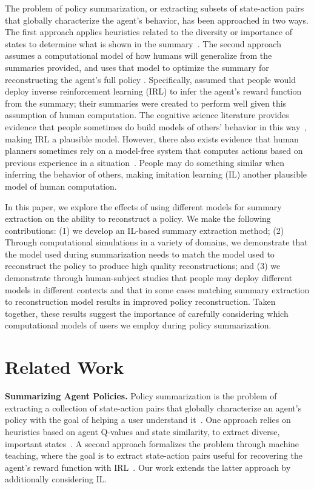 \documentclass{article}
\begin{document}
The problem of policy summarization, or extracting subsets of state-action pairs that globally characterize the agent's behavior, has been approached in two ways. The first approach applies heuristics related to the diversity or importance of states to determine what is shown in the summary~\cite{amir2018highlights,huang2018establishing}. The second approach assumes a computational model of how humans will generalize from the summaries provided, and uses that model to optimize the summary for reconstructing the agent's full policy \cite{huang17communicate}. Specifically, \cite{huang17communicate} assumed that people would deploy inverse reinforcement learning (IRL) to infer the agent's reward function from the summary; their summaries were created to perform well given this assumption of human computation. The cognitive science literature provides evidence that people sometimes do build models of others' behavior in this way~\cite{baker2009action,baker2011bayesian}, making IRL a plausible model. However, there also exists evidence that human planners sometimes rely on a model-free system that computes actions based on previous experience in a situation~\cite{daw2005arbitration}. People may do something similar when inferring the behavior of others, making imitation learning (IL) another plausible model of human computation. 

In this paper, we explore the effects of using different models for summary extraction on the ability to reconstruct a policy. We make the following contributions: (1) we develop an IL-based summary extraction method; (2) Through computational simulations in a variety of domains, we demonstrate that the model used during summarization needs to match the model used to reconstruct the policy to produce high quality reconstructions; and (3) we demonstrate through human-subject studies that people may deploy different models in different contexts and that in some cases matching summary extraction to reconstruction model results in improved policy reconstruction. Taken together, these results suggest the importance of carefully considering which computational models of users we employ during policy summarization.

\section{Related Work}

\textbf{Summarizing Agent Policies.} Policy summarization is the problem of extracting a collection of state-action pairs that globally characterize an agent's policy with the goal of helping a  user  understand it~\cite{amir2018agent}. One approach relies on heuristics based on agent Q-values and state similarity, to extract diverse, important states~\cite{amir2018highlights,huang2018establishing}. A second approach formalizes the problem through machine teaching, where the goal is to extract state-action pairs useful for recovering the agent's reward function with IRL~\cite{huang17communicate}. Our work extends the latter approach by additionally considering IL.
\end{document}
